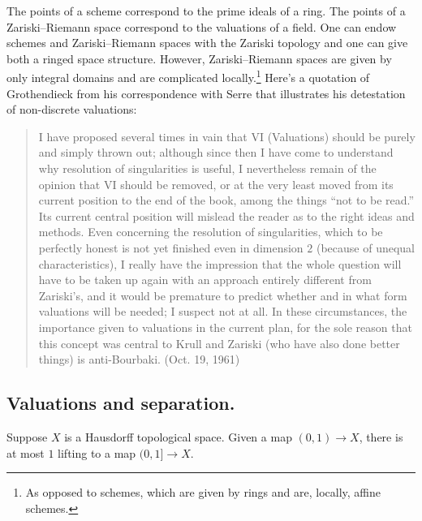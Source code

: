 \documentclass [11 pt, oneside] {article}
\begin{document}
The points of a scheme correspond to the prime ideals of a ring. The points of a Zariski--Riemann space correspond to the valuations of a field. One can endow schemes and Zariski--Riemann spaces with the Zariski topology and one can give both a ringed space structure. However, Zariski--Riemann spaces are given by only integral domains and are complicated locally.\footnote{As opposed to schemes, which are given by rings and are, locally, affine schemes.} Here's a quotation of Grothendieck from his correspondence with Serre that illustrates his detestation of non-discrete valuations:
\begin{quote}
	\small I have proposed several times in vain that VI (Valuations) should be purely and simply thrown out; although since then I have come to understand why resolution of singularities is useful, I nevertheless remain of the opinion that VI should be removed, or at the very least moved from its current position to the end of the book, among the things ``not to be read.'' Its current central position will mislead the reader as to the right ideas and methods. Even concerning the resolution of singularities, which to be perfectly honest is not yet finished even in dimension $2$ (because of unequal characteristics), I really have the impression that the whole question will have to be taken up again with an approach entirely different from Zariski's, and it would be premature to predict whether and in what form valuations will be needed; I suspect not at all. In these circumstances, the importance given to valuations in the current plan, for the sole reason that this concept was central to Krull and Zariski (who have also done better things) is anti-Bourbaki. (Oct. 19, 1961)
\end{quote}

\subsection{Valuations and separation.}
Suppose $X$ is a Hausdorff topological space. Given a map $(0,1)\longrightarrow X$, there is at most $1$ lifting to a map $(0,1]\longrightarrow X$.
\end{document}
